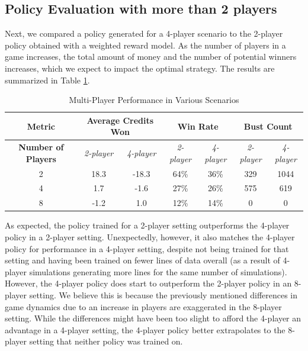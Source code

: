 \documentclass{article}
\begin{document}
\subsection{Policy Evaluation with more than 2 players}
Next, we compared a policy generated for a 4-player scenario to the 2-player policy obtained with a weighted reward model. As the number of players in a game increases, the total amount of money and the number of potential winners increases, which we expect to impact the optimal strategy. The results are summarized in Table \ref{tab:resultsMulti}.
\begin{table}[H]
\centering
\caption{Multi-Player Performance in Various Scenarios}
\begin{tabular}{ c | c | c | c | c | c | c }
\textbf{ Metric} & \multicolumn{2}{|c|}{\textbf{Average Credits Won}} & \multicolumn{2}{|c|}{\textbf{Win Rate}} & \multicolumn{2}{|c}{\textbf{Bust Count}}\\ \hline
 \textbf{Number of Players} & \textit{2-player} & \textit{4-player} & \textit{2-player} & \textit{4-player }& \textit{2-player} & \textit{4-player} \\ \hline
 2 & 18.3 & -18.3 & 64\% & 36\% & 329 & 1044 \\  
 4 & 1.7 & -1.6 & 27\% & 26\% & 575 & 619 \\
 8 & -1.2 & 1.0 & 12\% & 14\% & 0 & 0 \\
\end{tabular}
\label{tab:resultsMulti}
\end{table}
As expected, the policy trained for a 2-player setting outperforms the 4-player policy in a 2-player setting. Unexpectedly, however, it also matches the 4-player policy for performance in a 4-player setting, despite not being trained for that setting and having been trained on fewer lines of data overall (as a result of 4-player simulations generating more lines for the same number of simulations). However, the 4-player policy does start to outperform the 2-player policy in an 8-player setting. We believe this is because the previously mentioned differences in game dynamics due to an increase in players are exaggerated in the 8-player setting. While the differences might have been too slight to afford the 4-player an advantage in a 4-player setting, the 4-player policy better extrapolates to the 8-player setting that neither policy was trained on.
\end{document}
